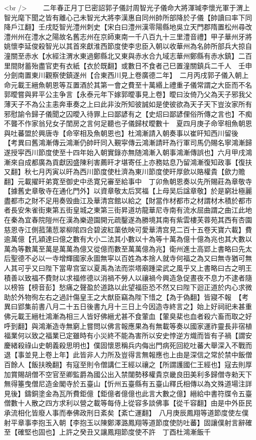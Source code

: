 <br />
　　二年春正月丁巳密詔郭子儀討周智光子儀命大將渾瑊李懷光軍于渭上智光麾下聞之皆有離心己未智光大將李漢惠自同州帥所部降於子儀【帥讀曰率下同降戶江翻】壬戌貶智光澧州刺史【宋白曰澧州漢零陽縣地吳立天門郡隋置松州尋改澧州州在澧水之陽故名舊志州在京師東南一千八百九十三里澧音禮】甲子華州牙將姚懷李延俊殺智光以其首來獻淮西節度使李忠臣入朝以收華州為名帥所部兵大掠自潼關至赤水【水經注渭水東過鄭縣北又東與赤水合九域志華州鄭縣有赤水鎮】二百里間財蓄殆盡官吏有衣紙【衣於既翻】或數日不食者己巳置潼關鎮兵二千人　壬申分劍南置東川觀察使鎮遂州【合東西川見上卷廣德二年】　二月丙戌郭子儀入朝上命元載王縉魚朝恩等互置酒於其第一會之費至十萬緡上禮重子儀常謂之大臣而不名郭曖嘗與昇平公主争言【永泰元年下嫁郭曖事見上卷】曖曰汝倚乃父為天子邪我父薄天子不為公主恚奔車奏之上曰此非汝所知彼誠如是使彼欲為天子天下豈汝家所有邪慰諭令歸子儀聞之囚曖入待罪上曰鄙諺有之【史炤曰鄙諺俚俗所傳之言也】不痴不聾不作家翁兒女子閨房之言何足聽也子儀歸杖曖數十　夏四月庚子命宰相魚朝恩與吐蕃盟於興唐寺【命宰相及魚朝恩也】杜鴻漸請入朝奏事以崔旰知西川留後　【考異曰舊鴻漸傳云鴻漸仍帥旰同入覲寜傳云鴻漸請旰為行軍司馬仍賜名寧鴻漸歸遂授寜西川節度使至十四年始入朝實錄亦無随鴻漸入朝事鴻漸傳誤也】六月甲戌鴻漸來自成都廣為貢獻因盛陳利害薦旰才堪寄任上亦務姑息乃留鴻漸復知政事【復扶又翻】秋七月丙寅以旰為西川節度使杜濟為東川節度使旰厚歛以賂權貴【歛力贍翻】元載擢旰弟寛至御史中丞寛兄審至給事中　丁卯魚朝恩奏以先所賜莊為章敬寺【據舊史章敬寺在通化門外】以資章敬太后冥福【上母吴后諡章敬】於是窮壯極麗盡都市之財不足用奏毁曲江及華清宫館以給之【財當作材都市之材謂材木積於都市者長安朱雀街東第五街皇城之東第三街昇道坊龍華尼寺南有流水屈曲謂之曲江此地在秦為宜春院隑州在漢為樂遊園開元疏鑿遂為勝境其南有紫雲樓芙蓉苑其西有杏園慈恩寺江側菰蒲䓤翠柳隂四合碧波紅蕖依映可愛華清宫見二百十五卷天寶六載】費逾萬億【孔潁達曰億之數有大小二法其小數以十為等十萬為億十億為兆也其大數以萬為等數萬至萬是萬萬為億又從億而數至萬萬億為兆】衛州進士高郢上書略曰先太后聖德不必以一寺增輝國家永圖無寜以百姓為本捨人就寺何福之為又曰無寺猶可無人其可乎又曰陛下當卑宫室以夏禹為法而崇塔廟踵梁武之風乎又上書略曰古之明王積善以致福不費財以求福修德以消禍不勞人以禳禍今興造急促晝夜不息力不逮者隨以榜笞【榜音彭】愁痛之聲盈於道路以此望福臣恐不然又曰陛下迴正道於内心求微助於外物徇左右之過計傷皇王之大猷臣竊為陛下惜之【為于偽翻】皆寢不報　【考異曰郢集前書八月二十五日後書九月十三日上今因造寺終言之】始上好祠祀未甚重佛元載王縉杜鴻漸為相三人皆好佛縉尤甚不食葷血【葷臭棐也血者殺六畜而取之好呼到翻】與鴻漸造寺無窮上嘗問以佛言報應果為有無載等奏以國家運祚靈長非宿植福業何以致之福業已定雖時有小災終不能為害所以安史悖逆方熾而皆有子禍【謂安慶緒殺祿山史朝義殺思明也】僕固懷恩稱兵内侮出門病死回紇吐蕃大舉深入不戰而退【事並見上卷上年】此皆非人力所及豈得言無報應也上由是深信之常於禁中飯僧百餘人【飯扶晚翻】有寇至則令僧講仁王經以禳之【所謂護國仁王經也】寇去則厚加賞賜胡僧不空官至卿監爵為國公出入禁闥勢移權貴京畿良田美利多歸僧寺勑天下無得箠曳僧尼造金閣寺於五臺山【忻州五臺縣有五臺山釋氏相傳以為文殊道場注詳見後】鑄銅塗金為瓦所費鉅億【鉅億者億億也此言大數之億】縉給中書符牒令五臺僧數十人散之四方求利以營之載等每侍上從容多談佛事【從千容翻】由是中外臣民承流相化皆廢人事而奉佛政刑日紊矣【紊亡運翻】　八月庚辰鳳翔等道節度使左僕射平章事李抱玉入朝【李抱玉以陳鄭澤潞鳳翔等道節度使防吐蕃】固讓僕射言辭確至【確堅也固也】上許之癸丑又讓鳳翔節度使不許　丁酉杜鴻漸飯千